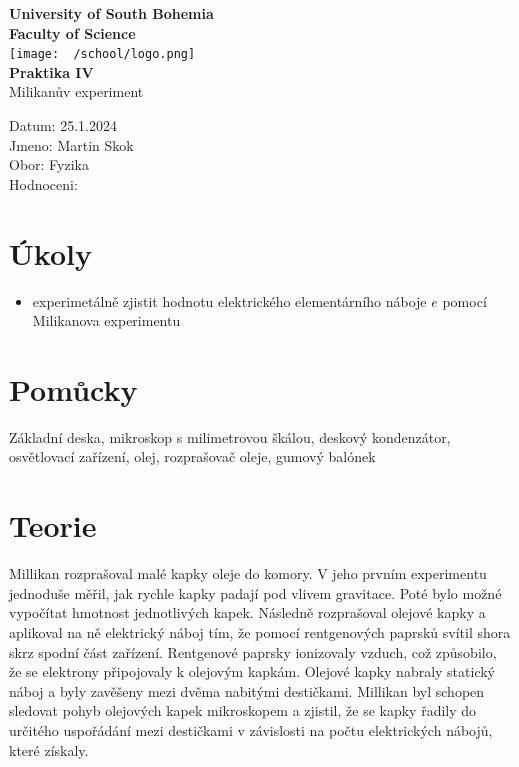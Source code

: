 \documentclass{article}
\begin{document}
\begin{center}
\textbf{\Huge{University of South Bohemia}}\\
\vspace{50px}
\textbf{\Large{Faculty of Science}} \\
\vspace{30px}
\texttt{[image: ~/school/logo.png]} \\
\vspace{30px}
\textbf{\large{Praktika IV}}
\vspace{20px}
\\
\vspace{20px}
\large{Milikanův experiment} \\
\vspace{60px}
\end{center}
\begin{flushleft}
Datum: 25.1.2024 \\
Jmeno: Martin Skok \\
Obor: Fyzika \\
Hodnoceni:
\end{flushleft}
\newpage
\section{Úkoly}
\begin{itemize}
  \item{experimetálně zjistit hodnotu elektrického elementárního náboje $e$ pomocí Milikanova experimentu}
\end{itemize}
\section{Pomůcky}
Základní deska, mikroskop s milimetrovou škálou, deskový kondenzátor, osvětlovací zařízení,
olej, rozprašovač oleje, gumový balónek
\section{Teorie}
Millikan rozprašoval malé kapky oleje do komory. V jeho prvním experimentu jednoduše měřil, jak rychle kapky padají pod vlivem gravitace. Poté bylo možné vypočítat hmotnost jednotlivých kapek. Následně rozprašoval olejové kapky a aplikoval na ně elektrický náboj tím, že pomocí rentgenových paprsků svítil shora skrz spodní část zařízení. Rentgenové paprsky ionizovaly vzduch, což způsobilo, že se elektrony připojovaly k olejovým kapkám. Olejové kapky nabraly statický náboj a byly zavěšeny mezi dvěma nabitými destičkami. Millikan byl schopen sledovat pohyb olejových kapek mikroskopem a zjistil, že se kapky řadily do určitého uspořádání mezi destičkami v závislosti na počtu elektrických nábojů, které získaly.\\
\end{document}
